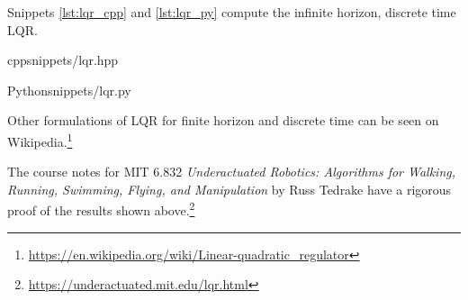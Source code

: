 Snippets \ref{lst:lqr_cpp} and \ref{lst:lqr_py} compute the infinite horizon,
discrete time LQR.
\begin{coderemote}{cpp}{snippets/lqr.hpp}
  \caption{Infinite horizon, discrete time LQR solver in C++ (see subsection
    \ref{subsec:dare} for DARE solver)}
  \label{lst:lqr_cpp}
\end{coderemote}
\begin{coderemote}{Python}{snippets/lqr.py}
  \caption{Infinite horizon, discrete time LQR solver in Python}
  \label{lst:lqr_py}
\end{coderemote}

Other formulations of LQR for finite horizon and discrete time can be seen on
Wikipedia.\footnote{\url{https://en.wikipedia.org/wiki/Linear-quadratic_regulator}}

The course notes for MIT 6.832 \textit{Underactuated Robotics: Algorithms for
Walking, Running, Swimming, Flying, and Manipulation} by Russ Tedrake have a
rigorous proof of the results shown
above.\footnote{\url{https://underactuated.mit.edu/lqr.html}}
